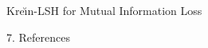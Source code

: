 \documentclass[final]{beamer}
\newcommand{\kr}{Kre\u{\i}n\xspace}
\DeclareMathOperator{\sign}{sign}
\newcommand{\ie}{\emph{i.e.}\xspace}
\newlength{\threecolwid}
\begin{document}
\begin{frame}[t]
\begin{columns}[t]
\begin{column}{\threecolwid}
\begin{block}{\kr-LSH for Mutual Information Loss}
% 		
% 		
	\end{block}
	
	\begin{block}{7. References}
		
		
	\end{block}
	
\end{column} %
 
		
	\end{columns} %
	
\end{frame} %
\end{document}
